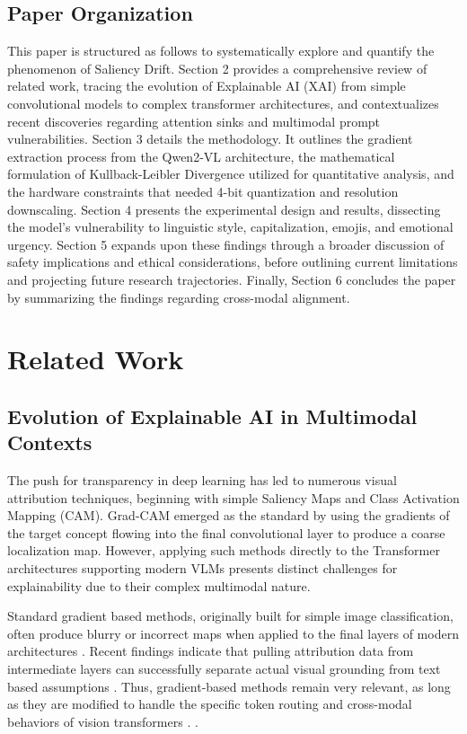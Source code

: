 \documentclass[11pt, letterpaper]{article}
\begin{document}
\subsection{Paper Organization}
This paper is structured as follows to systematically explore and quantify the phenomenon of Saliency Drift. Section 2 provides a comprehensive review of related work, tracing the evolution of Explainable AI (XAI) from simple convolutional models to complex transformer architectures, and contextualizes recent discoveries regarding attention sinks and multimodal prompt vulnerabilities. Section 3 details the methodology. It outlines the gradient extraction process from the Qwen2-VL architecture, the mathematical formulation of Kullback-Leibler Divergence utilized for quantitative analysis, and the hardware constraints that needed 4-bit quantization and resolution downscaling. Section 4 presents the experimental design and results, dissecting the model's vulnerability to linguistic style, capitalization, emojis, and emotional urgency. Section 5 expands upon these findings through a broader discussion of safety implications and ethical considerations, before outlining current limitations and projecting future research trajectories. Finally, Section 6 concludes the paper by summarizing the findings regarding cross-modal alignment.
\section{Related Work}

\subsection{Evolution of Explainable AI in Multimodal Contexts}
The push for transparency in deep learning has led to numerous visual attribution techniques, beginning with simple Saliency Maps and Class Activation Mapping (CAM). Grad-CAM \citep{Selvaraju_2019} emerged as the standard by using the gradients of the target concept flowing into the final convolutional layer to produce a coarse localization map. However, applying such methods directly to the Transformer architectures supporting modern VLMs presents distinct challenges for explainability due to their complex multimodal nature.

Standard gradient based methods, originally built for simple image classification, often produce blurry or incorrect maps when applied to the final layers of modern architectures \citep{bousselham2026dexardynamicexplainabilitymethod}. Recent findings indicate that pulling attribution data from intermediate layers can successfully separate actual visual grounding from text based assumptions \citep{darcet2024visiontransformersneedregisters}. Thus, gradient-based methods remain very relevant, as long as they are modified to handle the specific token routing and cross-modal behaviors of vision transformers \citep{wall2026gradcamvisiontransformerssystematic}. 
.
\end{document}

